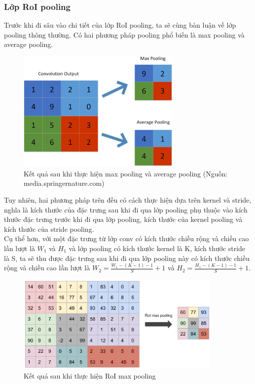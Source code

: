 {    \subsubsection{Lớp RoI pooling}
    Trước khi đi sâu vào chi tiết của lớp RoI pooling, ta sẽ cùng bàn luận về lớp pooling thông thường.
    Có hai phương pháp pooling phổ biến là max pooling và average pooling.

    \begin{figure}[H]
        \centering
        \includegraphics[width=8cm] {images/pooling}
        \caption{Kết quả sau khi thực hiện max pooling và average pooling (Nguồn: media.springernature.com)}
        \label{fig:pooling}
    \end{figure}

    \noindent
    Tuy nhiên, hai phương pháp trên đều có cách thực hiện dựa trên kernel và stride, nghĩa là kích thước của đặc trưng sau khi đi qua lớp pooling phụ thuộc vào kích thước đặc trưng trước khi đi qua lớp pooling, kích thước của kernel pooling và kích thước của stride pooling. \\
    Cụ thể hơn, với một đặc trưng từ lớp conv có kích thước chiều rộng và chiều cao lần lượt là ${W}_{1}$ và ${H}_{1}$ và lớp pooling có kích thước kernel là K, kích thước stride là S, ta sẽ thu được đặc trưng sau khi đi qua lớp pooling này có kích thước chiều rộng và chiều cao lần lượt là ${W}_{2} = \frac{{W}_{1} - (K - 1) - 1}{S} + 1$ và ${H}_{2} = \frac{{H}_{1} - (K - 1) - 1}{S} + 1$.

    \begin{figure}[H]
        \centering
        \includegraphics[width=10cm] {images/roi_pooling}
        \caption{Kết quả sau khi thực hiện RoI max pooling}
        \label{fig:roi_pooling}
    \end{figure}

}
